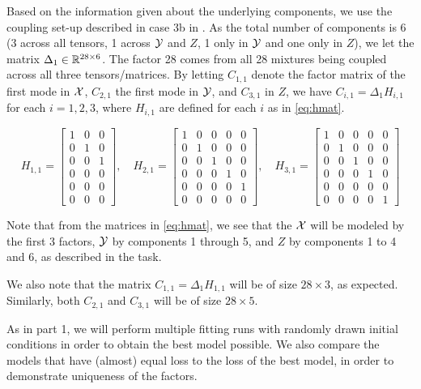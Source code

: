 Based on the information given about the underlying components, we use the coupling set-up described in case 3b in \textcite{framework}.
As the total number of components is 6 (3 across all tensors, 1 across $\mathcal{Y}$ and $Z$, 1 only in $\mathcal{Y}$ and one only in $Z$), we let the matrix $\Delta_1 \in \mathbb{R}^{28 \times 6}$.
The factor 28 comes from all 28 mixtures being coupled across all three tensors/matrices.
By letting $C_{1,1}$ denote the factor matrix of the first mode in $\mathcal{X}$, $C_{2,1}$ the first mode in $\mathcal{Y}$, and $C_{3,1}$ in $Z$, we have $C_{i, 1} = \Delta_1 H_{i,1}$ for each $i=1,2,3$, where $H_{i,1}$ are defined for each $i$ as in \eqref{eq:hmat}.

\begin{equation}
    H_{1,1} = \begin{bmatrix}
        1 & 0 & 0 \\
        0 & 1 & 0 \\
        0 & 0 & 1 \\
        0 & 0 & 0 \\
        0 & 0 & 0 \\
        0 & 0 & 0
    \end{bmatrix}, \quad
    H_{2,1} = \begin{bmatrix}
        1 & 0 & 0 & 0 & 0 \\
        0 & 1 & 0 & 0 & 0 \\
        0 & 0 & 1 & 0 & 0 \\
        0 & 0 & 0 & 1 & 0 \\
        0 & 0 & 0 & 0 & 1 \\
        0 & 0 & 0 & 0 & 0
    \end{bmatrix}, \quad
    H_{3,1} = \begin{bmatrix}
        1 & 0 & 0 & 0 & 0 \\
        0 & 1 & 0 & 0 & 0 \\
        0 & 0 & 1 & 0 & 0 \\
        0 & 0 & 0 & 1 & 0 \\
        0 & 0 & 0 & 0 & 0 \\
        0 & 0 & 0 & 0 & 1
    \end{bmatrix}
    \label{eq:hmat}
\end{equation}

Note that from the matrices in \eqref{eq:hmat}, we see that the $\mathcal{X}$ will be modeled by the first 3 factors, $\mathcal{Y}$ by components 1 through 5, and $Z$ by components 1 to 4 and 6, as described in the task.

We also note that the matrix $C_{1,1} = \Delta_1 H_{1,1}$ will be of size $28 \times 3$, as expected.
Similarly, both $C_{2,1}$ and $C_{3,1}$ will be of size $28 \times 5$.

As in part 1, we will perform multiple fitting runs with randomly drawn initial conditions in order to obtain the best model possible.
We also compare the models that have (almost) equal loss to the loss of the best model, in order to demonstrate uniqueness of the factors.


